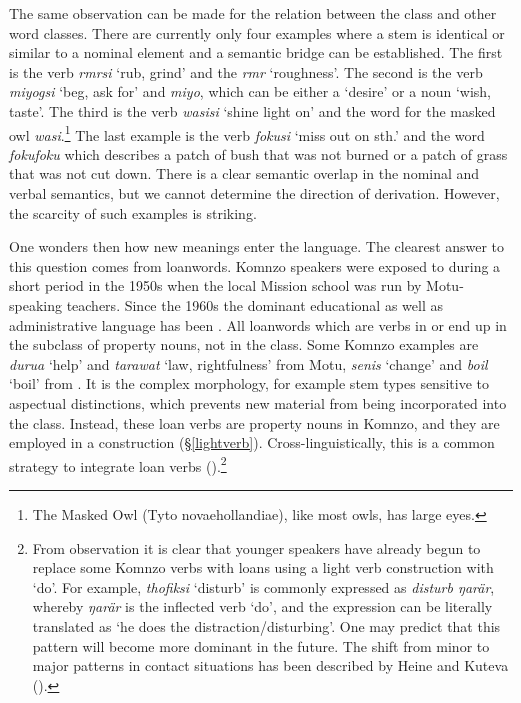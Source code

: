 The same observation can be made for the relation between the  class and other word classes. There are currently only four examples where a  stem is identical or similar to a nominal element and a semantic bridge can be established. The first is the verb \emph{rmrsi} `rub, grind' and the  \emph{rmr} `roughness'. The second is the verb \emph{miyogsi} `beg, ask for' and \emph{miyo}, which can be either a  `desire' or a noun `wish, taste'. The third is the verb \emph{wasisi} `shine light on' and the word for the masked owl \emph{wasi}.\footnote{The Masked Owl (Tyto novaehollandiae), like most owls, has large eyes.} The last example is the verb \emph{fokusi} `miss out on sth.' and the word \emph{fokufoku} which describes a patch of bush that was not burned or a patch of grass that was not cut down. There is a clear semantic overlap in the nominal and verbal semantics, but we cannot determine the direction of derivation. However, the scarcity of such examples is striking.

One wonders then how new  meanings enter the language. The clearest answer to this question comes from loanwords. Komnzo speakers were exposed to  during a short period in the 1950s when the local Mission school was run by Motu-speaking teachers. Since the 1960s the dominant educational as well as administrative language has been . All loanwords which are verbs in  or  end up in the  subclass of property nouns, not in the  class. Some Komnzo examples are \emph{durua} `help' and \emph{tarawat} `law, rightfulness' from Motu, \emph{senis} `change' and \emph{boil} `boil' from . It is the complex  morphology, for example stem types sensitive to aspectual distinctions, which prevents new material from being incorporated into the  class. Instead, these loan verbs are property nouns in Komnzo, and they are employed in a  construction ({\S}\ref{lightverb}). Cross-linguistically, this is a common strategy to integrate loan verbs (\citealt{Wichmann:2008loanverbs}).\footnote{From observation it is clear that younger speakers have already begun to replace some Komnzo verbs with  loans using a light verb construction with `do'. For example, \emph{thofiksi} `disturb' is commonly expressed as \emph{disturb ŋarär}, whereby \emph{ŋarär} is the inflected verb `do', and the expression can be literally translated as `he does the distraction/disturbing'. One may predict that this pattern will become more dominant in the future. The shift from minor to major patterns in contact situations has been described by Heine and Kuteva (\citeyear[44]{Heine:2005wp}).}

